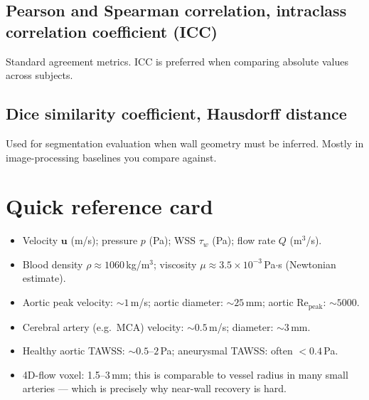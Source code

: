 \documentclass[11pt]{article}
\begin{document}
\subsection*{Pearson and Spearman correlation, intraclass correlation coefficient (ICC)}
Standard agreement metrics. ICC is preferred when comparing absolute values across subjects.

\subsection*{Dice similarity coefficient, Hausdorff distance}
Used for segmentation evaluation when wall geometry must be inferred. Mostly in image-processing baselines you compare against.

\section*{Quick reference card}
\begin{itemize}[noitemsep]
\item Velocity $\mathbf{u}$ (m/s); pressure $p$ (Pa); WSS $\tau_w$ (Pa); flow rate $Q$ (m$^3$/s).
\item Blood density $\rho \approx 1060$\,kg/m$^3$; viscosity $\mu \approx 3.5 \times 10^{-3}$\,Pa$\cdot$s (Newtonian estimate).
\item Aortic peak velocity: $\sim 1$\,m/s; aortic diameter: $\sim 25$\,mm; aortic Re$_\text{peak}$: $\sim 5000$.
\item Cerebral artery (e.g.\ MCA) velocity: $\sim 0.5$\,m/s; diameter: $\sim 3$\,mm.
\item Healthy aortic TAWSS: $\sim 0.5$--$2$\,Pa; aneurysmal TAWSS: often $< 0.4$\,Pa.
\item 4D-flow voxel: 1.5--3\,mm; this is comparable to vessel radius in many small arteries --- which is precisely why near-wall recovery is hard.
\end{itemize}
\end{document}
